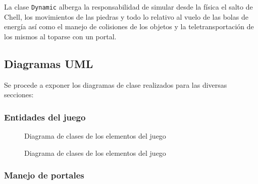 \documentclass[a4paper]{article}
\begin{document}
La clase \texttt{Dynamic} alberga la responsabilidad de simular desde la física el salto de Chell, los movimientos de las piedras y todo lo relativo al vuelo de las bolas de energía así como el manejo de colisiones de los objetos y la teletransportación de los mismos al toparse con un portal.

\subsection{Diagramas UML}

Se procede a exponer los diagramas de clase realizados para las diversas secciones:

\subsubsection{Entidades del juego}

\begin{figure}[!h]
	\caption{Diagrama de clases de los elementos del juego}
	\label{fig:diagrama1}
\end{figure}

\begin{figure}[!h]
	\caption{Diagrama de clases de los elementos del juego}
	\label{fig:diagrama2}
\end{figure}

\newpage
\subsubsection{Manejo de portales}
\end{document}
